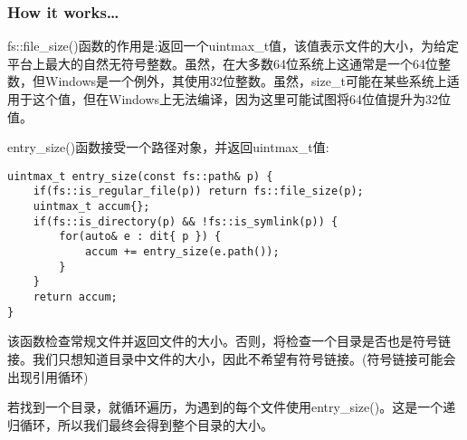 \subsubsection{How it works…}

fs::file\_size()函数的作用是:返回一个uintmax\_t值，该值表示文件的大小，为给定平台上最大的自然无符号整数。虽然，在大多数64位系统上这通常是一个64位整数，但Windows是一个例外，其使用32位整数。虽然，size\_t可能在某些系统上适用于这个值，但在Windows上无法编译，因为这里可能试图将64位值提升为32位值。

entry\_size()函数接受一个路径对象，并返回uintmax\_t值:

\begin{lstlisting}[style=styleCXX]
uintmax_t entry_size(const fs::path& p) {
	if(fs::is_regular_file(p)) return fs::file_size(p);
	uintmax_t accum{};
	if(fs::is_directory(p) && !fs::is_symlink(p)) {
		for(auto& e : dit{ p }) {
			accum += entry_size(e.path());
		}
	}
	return accum;
}
\end{lstlisting}

该函数检查常规文件并返回文件的大小。否则，将检查一个目录是否也是符号链接。我们只想知道目录中文件的大小，因此不希望有符号链接。(符号链接可能会出现引用循环)

若找到一个目录，就循环遍历，为遇到的每个文件使用entry\_size()。这是一个递归循环，所以我们最终会得到整个目录的大小。


























